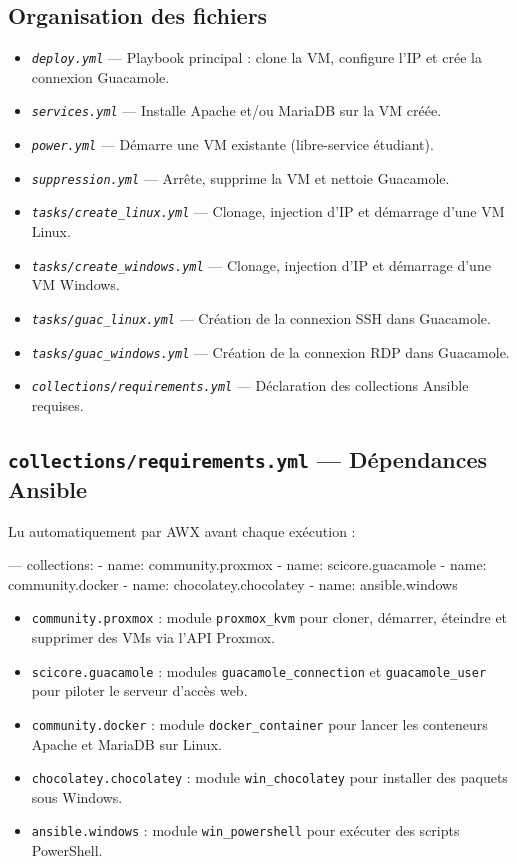 \documentclass[a4paper]{article}
\newcommand{\cmd}[1]{\texttt{#1}}
\newcommand{\file}[1]{\texttt{\textit{#1}}}
\begin{document}
\subsection{Organisation des fichiers}

\begin{itemize}
  \item \file{deploy.yml} --- Playbook principal : clone la VM, configure l'IP et crée la connexion Guacamole.
  \item \file{services.yml} --- Installe Apache et/ou MariaDB sur la VM créée.
  \item \file{power.yml} --- Démarre une VM existante (libre-service étudiant).
  \item \file{suppression.yml} --- Arrête, supprime la VM et nettoie Guacamole.
  \item \file{tasks/create\_linux.yml} --- Clonage, injection d'IP et démarrage d'une VM Linux.
  \item \file{tasks/create\_windows.yml} --- Clonage, injection d'IP et démarrage d'une VM Windows.
  \item \file{tasks/guac\_linux.yml} --- Création de la connexion SSH dans Guacamole.
  \item \file{tasks/guac\_windows.yml} --- Création de la connexion RDP dans Guacamole.
  \item \file{collections/requirements.yml} --- Déclaration des collections Ansible requises.
\end{itemize}

\subsection{\texttt{collections/requirements.yml} --- Dépendances Ansible}

Lu automatiquement par AWX avant chaque exécution :

\begin{yamlcode}
---
collections:
  - name: community.proxmox
  - name: scicore.guacamole
  - name: community.docker
  - name: chocolatey.chocolatey
  - name: ansible.windows
\end{yamlcode}

\begin{itemize}
  \item \cmd{community.proxmox} : module \cmd{proxmox\_kvm} pour cloner, démarrer, éteindre et supprimer des VMs via l'API Proxmox.
  \item \cmd{scicore.guacamole} : modules \cmd{guacamole\_connection} et \cmd{guacamole\_user} pour piloter le serveur d'accès web.
  \item \cmd{community.docker} : module \cmd{docker\_container} pour lancer les conteneurs Apache et MariaDB sur Linux.
  \item \cmd{chocolatey.chocolatey} : module \cmd{win\_chocolatey} pour installer des paquets sous Windows.
  \item \cmd{ansible.windows} : module \cmd{win\_powershell} pour exécuter des scripts PowerShell.
\end{itemize}
\end{document}
